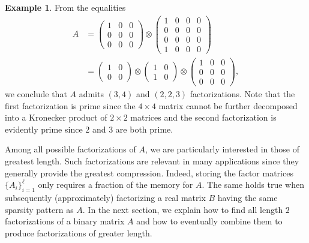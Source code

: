\documentclass{article}
\numberwithin{equation}{section}
\theoremstyle{definition}
\newtheorem{example}[definition]{Example}
\begin{document}
\begin{example}
\label{ex: non_max_mat_12}
From the equalities
\begin{align*}
A &=
\begin{pmatrix}
1 & 0 & 0 \\
0 & 0 & 0 \\
0 & 0 & 0
\end{pmatrix}
\otimes
\begin{pmatrix}
1 & 0 & 0 & 0 \\
0 & 0 & 0 & 0 \\
0 & 0 & 0 & 0 \\
1 & 0 & 0 & 0
\end{pmatrix} \\
&=
\begin{pmatrix}
1 & 0 \\
0 & 0
\end{pmatrix}
\otimes
\begin{pmatrix}
1 & 0 \\
1 & 0
\end{pmatrix}
\otimes
\begin{pmatrix}
1 & 0 & 0 \\
0 & 0 & 0 \\
0 & 0 & 0
\end{pmatrix},
\end{align*}
we conclude that $A$ admits $(3,4)$ and $(2,2,3)$ factorizations. Note that the first factorization is prime since the $4 \times 4$ matrix cannot be further decomposed into a Kronecker product of $2 \times 2$ matrices and the second factorization is evidently prime since $2$ and $3$ are both prime.
\end{example}

Among all possible factorizations of $A$, we are particularly interested in those of greatest length. Such factorizations are relevant in many applications since they generally provide the greatest compression. Indeed, storing the factor matrices $\{A_i\}_{i=1}^\ell$ only requires a fraction of the memory for $A$. The same holds true when subsequently (approximately) factorizing a real matrix $B$ having the same sparsity pattern as $A$. In the next section, we explain how to find all length $2$ factorizations of a binary matrix $A$ and how to eventually combine them to produce factorizations of greater length.
\end{document}
